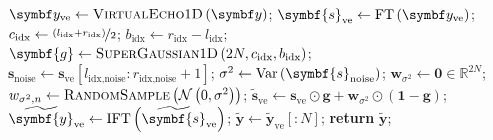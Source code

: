 \begin{algorithm}
    \begin{algorithmic}
        \caption[
            Filtering procedure for 1D data.
        ]
        {
            Filtering procedure for 1D data.
            $l_{\text{idx}}$ and $r_{\text{idx}}$ are indices of the left and
            right bounds of the region of interest.
            $l_{\text{idx,noise}}$ and $r_{\text{idx,noise}}$ are the analogous
            bounds for the noise region. All of these values should be $\in
            \lbrace 0, \cdots 2N - 1 \rbrace$.
            These would typically be provided in units of \unit{\hertz} or
            \unit{\partspermillion} by a user; conversion to indices can
            be carried out using \cref{eq:fidx}.
            \textsc{RandomSample} indicates taking a random sample from the
            given distribution.
        }
        \label{alg:filter-1d}
            \State $\by_{\text{ve}} \gets \textsc{VirtualEcho$1$D}\left(\by\right)$;
            \State $\symbf{s}_{\text{ve}} \gets \FT\left(\by_{\text{ve}}\right)$;
            \State $c_{\text{idx}} \gets \nicefrac{\left(l_{\text{idx}} + r_{\text{idx}}\right)}{2}$;
            \State $b_{\text{idx}} \gets r_{\text{idx}} - l_{\text{idx}}$;
            \State $\symbf{g} \gets \textsc{SuperGaussian$1$D}\left(2N, c_{\text{idx}}, b_{\text{idx}}\right)$;
            \State $\symbf{s}_{\text{noise}} \gets \symbf{s}_{\text{ve}} \left[
                l_{\text{idx,noise}} : r_{\text{idx,noise}} + 1
            \right]
            $;
            \State $\sigma^2 \gets \Var\left(\symbf{s}_{\text{noise}}\right)$;
            \State $\symbf{w}_{\sigma^2} \gets \symbf{0} \in \mathbb{R}^{2N}$;
            \State $w_{\sigma^2,n} \gets \textsc{RandomSample}\left(\mathcal{N}\left(0, \sigma^2\right)\right)$;
            \EndFor
            \State $\widetilde{\symbf{s}}_{\text{ve}} \gets \symbf{s}_{\text{ve}} \odot \symbf{g} + \symbf{w}_{\sigma^2} \odot \left(\symbf{1} - \symbf{g}\right)$;
            \State $\widetilde{\symbf{y}}_{\text{ve}} \gets \IFT \left( \widetilde{\symbf{s}}_{\text{ve}} \right)$;
            \State $\widetilde{\symbf{y}} \gets \widetilde{\symbf{y}}_{\text{ve}}[:N]$;
            \State \textbf{return} $\widetilde{\symbf{y}}$;
        \EndProcedure
        \Statex

\end{algorithmic}
\end{algorithm}
